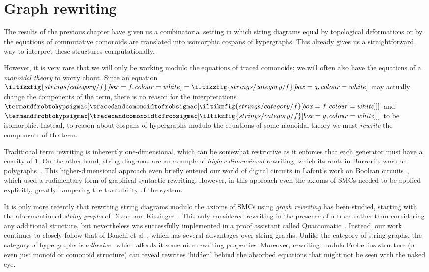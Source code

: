 \chapter{Graph rewriting}

The results of the previous chapter have given us a combinatorial setting in
which string diagrams equal by topological deformations or by the equations of
commutative comonoids are translated into isomorphic cospans of hypergraphs.
This already gives us a straightforward way to interpret these structures
computationally.

However, it is very rare that we will only be working modulo the equations of
traced comonoids; we will often also have the equations of a
\emph{monoidal theory} to worry about.
Since an equation \(
\iltikzfig{strings/category/f}[box=f,colour=white]
=
\iltikzfig{strings/category/f}[box=g,colour=white]
\) may actually change the components of the term, there is no reason for the
interpretations \(
\termandfrobtohypsigmac[
    \tracedandcomonoidtofrobsigmac[
        \iltikzfig{strings/category/f}[box=f,colour=white]
    ]
]
\) and \(
\termandfrobtohypsigmac[
    \tracedandcomonoidtofrobsigmac[
        \iltikzfig{strings/category/f}[box=g,colour=white]
    ]
]
\) to be isomorphic.
Instead, to reason about cospans of hypergraphs modulo the equations of some
monoidal theory we must \emph{rewrite} the components of the term.

Traditional term rewriting is inherently one-dimensional, which can be somewhat
restrictive as it enforces that each generator must have a coarity of \(1\).
On the other hand, string diagrams are an example of \emph{higher dimensional}
rewriting, which its roots in Burroni's work on
polygraphs~\cite{burroni1993higherdimensional}.
This higher-dimensional approach even briefly entered our world of digital
circuits in Lafont's work on Boolean circuits~\cite{lafont2003algebraic}, which
used a rudimentary form of graphical syntactic rewriting.
However, in this approach even the axioms of SMCs needed to be applied
explicitly, greatly hampering the tractability of the system.

It is only more recently that rewriting string diagrams modulo the axioms of
SMCs using \emph{graph rewriting} has been studied, starting with the
aforementioned \emph{string graphs} of Dixon and
Kissinger~\cite{dixon2010open,kissinger2012pictures,dixon2013opengraphs}.
This only considered rewriting in the presence of a trace rather than
considering any additional structure, but nevertheless was successfully
implemented in a proof assistant called
Quantomatic~\cite{kissinger2015quantomatic}.
Instead, our work continues to closely follow that of Bonchi et
al~\cite{bonchi2022string,bonchi2022stringa}, which has several advantages
over string graphs.
Unlike the category of string graphs, the category of hypergraphs is
\emph{adhesive}~\cite{lack2004adhesive} which affords it some nice rewriting
properties.
Moreover, rewriting modulo Frobenius structure (or even just monoid or comonoid
structure) can reveal rewrites `hidden' behind the absorbed equations that might
not be seen with the naked eye.

